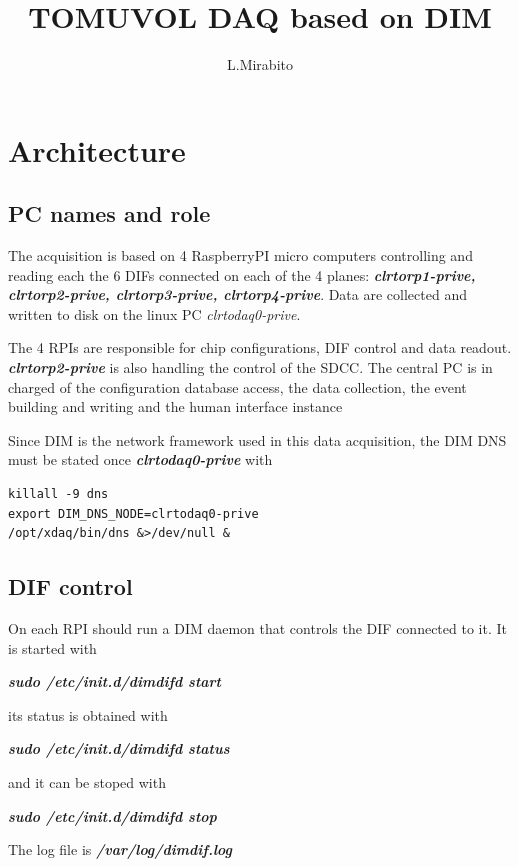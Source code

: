 \documentclass[english]{article}
\title{\textbf{TOMUVOL DAQ based on DIM}}
\author{L.Mirabito}
\date{}
\begin{document}
\maketitle

\section{Architecture}

\subsection{PC names and role}
The acquisition is based on 4 RaspberryPI micro computers controlling and reading each the 6 DIFs connected on each of the 4 planes: {\sl \bf clrtorp1-prive, clrtorp2-prive, clrtorp3-prive, clrtorp4-prive}. Data are collected and written to disk on the linux PC {\sl clrtodaq0-prive}.

The 4 RPIs are responsible for chip configurations, DIF control and data readout. {\sl \bf clrtorp2-prive} is also handling the control of the SDCC. The central PC is in charged of the configuration database access, the data collection, the event building and writing and the human interface instance

Since DIM is the network framework used in this data acquisition, the DIM DNS must be stated once {\sl \bf clrtodaq0-prive} with
\begin{verbatim}
killall -9 dns
export DIM_DNS_NODE=clrtodaq0-prive
/opt/xdaq/bin/dns &>/dev/null &
\end{verbatim}

\subsection{DIF control}

On each RPI should run a DIM daemon that controls the DIF connected to it. It is started with

{\sl \bf sudo /etc/init.d/dimdifd start }

its status is obtained with 

{\sl \bf sudo /etc/init.d/dimdifd status }

and it can be stoped with

{\sl \bf sudo /etc/init.d/dimdifd stop }

The log file is {\sl \bf /var/log/dimdif.log }
\end{document}
